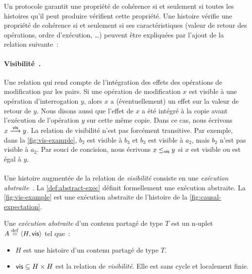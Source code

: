 Un protocole garantit une propriété de cohérence si et seulement si toutes les histoires qu'il peut produire vérifient cette propriété.
Une histoire vérifie une propriété de cohérence si et seulement si ses caractéristiques (valeur de retour des opérations, ordre d'exécution, \ldots) peuvent être expliquées par l'ajout de la relation suivante~:

\paragraph{Visibilité~\autocite{burckhardt_eventualconsistency_2014}.} Une relation qui rend compte de l'intégration des effets des opérations de modification par les pairs.
Si une opération de modification $x$ est visible à une opération d'interrogation $y$, alors $x$ a (éventuellement) un effet sur la valeur de retour de $y$.
Nous disons aussi que l'effet de $x$ a été intégré à la copie avant l'exécution de l'opération $y$ sur cette même copie.
Dans ce cas, nous écrivons $x \vis y$.
La relation de visibilité n'est pas forcément transitive.
Par exemple, dans la \autoref{fig:vis-example}, $b_2$ est visible à $b_3$ et $b_3$ est visible à $a_2$, mais $b_2$ n'est pas visible à $a_2$.
Par souci de concision, nous écrivons $x \viseq y$ si $x$ est visible ou est égal à $y$.


\paragraph{} Une histoire augmentée de la relation de \emph{visibilité} consiste en une \emph{exécution abstraite}~\autocite{burckhardt_eventualconsistency_2014}.
La \autoref{def:abstract-exec} définit formellement une exécution abstraite.
La \autoref{fig:vis-example} est une exécution abstraite de l'histoire de la \autoref{fig:causal-expectation}.

\begin{definition}\label{def:abstract-exec}
Une \emph{exécution abstraite} d'un contenu partagé de type $T$ est un n-uplet $A \defeq \tuple*{H, \trm{vis}}$ tel que~:
\begin{itemize}
  \item $H$ est une histoire d'un contenu partagé de type $T$.

  \item $\trm{vis} \subseteq H \times H$ est la relation de \emph{visibilité}. Elle est sans cycle et localement finie.
\end{itemize}
\end{definition}

